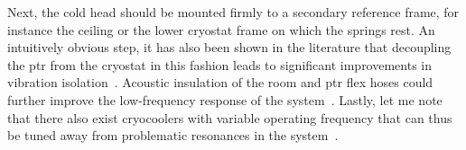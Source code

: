 Next, the cold head should be mounted firmly to a secondary reference frame, for instance the ceiling or the lower cryostat frame on which the springs rest.
An intuitively obvious step, it has also been shown in the literature that decoupling the \gls{ptr} from the cryostat in this fashion leads to significant improvements in vibration isolation~\cite{Olivieri2017}.
Acoustic insulation of the room and \gls{ptr} flex hoses could further improve the low-frequency response of the system~\cite{Schmoranzer2019,Oh2021}.
Lastly, let me note that there also exist cryocoolers with variable operating frequency that can thus be tuned away from problematic resonances in the system~\cite{TransMitPTR}.
